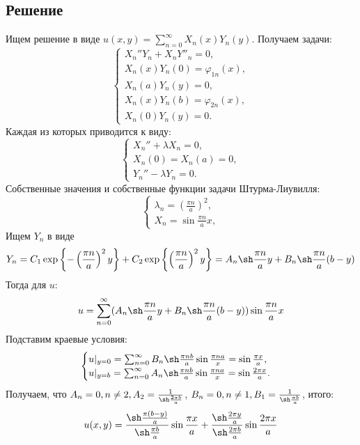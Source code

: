 \documentclass[11pt]{article}
\begin{document}
\subsection{Решение}
\label{sec:org1cc5ae7}
Ищем решение в виде $u(x, y) = \sum_{n = 0}^{\infty}X_n(x)Y_n(y)$. Получаем задачи:
\begin{equation}
\begin{cases}
X_n''Y_n + X_nY''_n = 0, \\
X_n(x)Y_n(0) = \varphi_{1n}(x), \\
X_n(a)Y_n(y) = 0, \\
X_n(x)Y_n(b) = \varphi_{2n}(x), \\
X_n(0)Y_n(y) = 0.
\end{cases}
\end{equation}
Каждая из которых приводится к виду:
\begin{equation*}
\begin{cases}
X_n'' + \lambda X_n = 0, \\
X_n(0) = X_n(a) = 0, \\
Y_n'' - \lambda Y_n = 0.
\end{cases}
\end{equation*}
Собственные значения и собственные функции задачи Штурма-Лиувилля:
\begin{equation*}
\begin{cases}
\lambda_n = \left(\frac{\pi n}a\right)^2, \\
X_n = \sin\frac{\pi n}ax,
\end{cases}
\end{equation*}
Ищем $Y_n$ в виде
\begin{equation*}
Y_n = C_1\exp\left\{-\left(\frac{\pi n}a\right)^2y\right\} + C_2\exp\left\{\left(\frac{\pi n}a\right)^2y\right\}
= A_n\sh\frac{\pi n}ay + B_n\sh\frac{\pi n}a(b - y)
\end{equation*}
Тогда для $u$:
\begin{equation*}
u = \sum_{n = 0}^{\infty}(A_n\sh\frac{\pi n}ay + B_n\sh\frac{\pi n}a(b - y))\sin\frac{\pi n}ax
\end{equation*}
Подставим краевые условия:
\begin{equation*}
\begin{cases}
u|_{y = 0} = \sum_{n = 0}^{\infty}B_n\sh\frac{\pi n b}a\sin\frac{\pi n a}x = \sin\frac{\pi x}a, \\
u|_{y = b} = \sum_{n = 0}^{\infty}A_n\sh\frac{\pi n b}a\sin\frac{\pi n a}x = \sin\frac{2\pi x}a.
\end{cases}
\end{equation*}
Получаем, что $A_n = 0, n \neq 2, A_2 = \frac1{\sh\frac{2\pi b}a}$, $B_n = 0, n \neq 1, B_1 = \frac1{\sh\frac{\pi b}a}$, итого:
\begin{equation}
u(x, y) = \frac{\sh\frac{\pi(b - y)}a}{\sh\frac{\pi b}a}\sin\frac{\pi x}a +
\frac{\sh\frac{2\pi y}a}{\sh\frac{2\pi b}a}\sin\frac{2\pi x}a
\end{equation}
\end{document}
